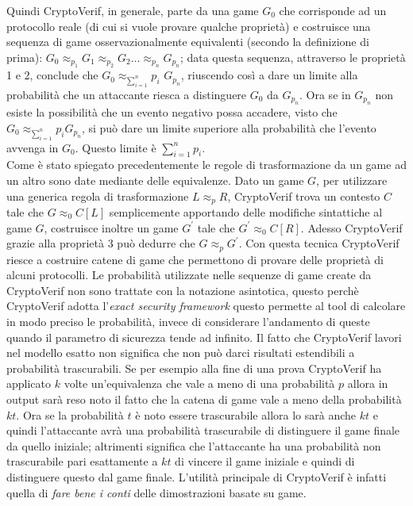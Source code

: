 \documentclass[a4paper,openright,twoside,12pt]{report}
\begin{document}
Quindi CryptoVerif, in generale, parte da una game $G_0$ che corrisponde ad un protocollo reale (di cui si vuole provare qualche propriet\`a) e costruisce una sequenza di game 
osservazionalmente equivalenti (secondo la definizione di prima): $G_0 \approx_{p_1} G_1 \approx_{p_2} G_2 \dots \approx_{p_n} G_{p_{n}} $; data questa sequenza, 
attraverso le propriet\`a 1 e 2, conclude che $G_0  \approx_{\sum_{i=1}^{n}}{p_i}$ $G_{p_{n}} $, riuscendo cos\`i a dare un limite alla probabilit\`a che un attaccante riesca a distinguere
$G_0$ da $G_{p_{n}}$. Ora se in $G_{p_{n}}$ non esiste la possibilit\`a che un evento negativo possa accadere, visto che $G_0  \approx_{\sum_{i=1}^{n}}{p_i} G_{p_{n}} $, si pu\`o dare un limite superiore alla probabilit\`a che l'evento avvenga in $G_0$.
Questo limite \`e $\sum_{i=1}^{n}p_i$.\\Come \`e stato spiegato precedentemente le regole di trasformazione da un game ad un altro sono date mediante delle equivalenze. 
Dato un game $G$, per utilizzare una generica regola di trasformazione  $L \approx_p R$, CryptoVerif trova un contesto $C$ tale che $G \approx_0 C[L] $ semplicemente 
apportando delle modifiche sintattiche al game $G$, costruisce inoltre un game $G^{'}$ tale che $G^{'} \approx_0 C[R]$. Adesso CryptoVerif grazie alla propriet\`a 3 pu\`o dedurre che $G \approx_p G^{'}$. Con questa tecnica CryptoVerif riesce a costruire catene
di game che permettono di provare delle propriet\`a di alcuni protocolli.
Le probabilit\`a utilizzate nelle sequenze di game create da CryptoVerif non sono trattate con la notazione asintotica, questo perch\`e
CryptoVerif adotta l'\emph{exact security framework} questo permette al tool di calcolare in modo preciso le probabilit\`a, invece di 
considerare l'andamento di queste quando il parametro di sicurezza tende ad infinito.
Il fatto che CryptoVerif lavori nel modello esatto non significa che non pu\`o darci risultati estendibili a probabilit\`a trascurabili.
Se per esempio alla fine di una prova CryptoVerif ha applicato $k$ volte un'equivalenza che vale a meno di una probabilit\`a $p$ allora
in output sar\`a reso noto il fatto che la catena di game vale a meno della probabilit\`a $kt$. Ora se la probabilit\`a $t$ \`e noto essere
trascurabile allora lo sar\`a anche $kt$ e quindi l'attaccante avr\`a una probabilit\`a trascurabile di distinguere il game finale da quello iniziale; 
altrimenti significa che l'attaccante ha una probabilit\`a non trascurabile pari esattamente a $kt$ di vincere il game iniziale e quindi
di distinguere questo dal game finale. 
L'utilit\`a principale di CryptoVerif \`e infatti quella di \emph{fare bene i conti} delle dimostrazioni basate su game.
\end{document}
